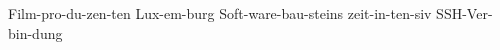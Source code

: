 \hyphenation
{
    Film-pro-du-zen-ten
    Lux-em-burg
    Soft-ware-bau-steins
    zeit-in-ten-siv
    SSH-Ver-bin-dung
}